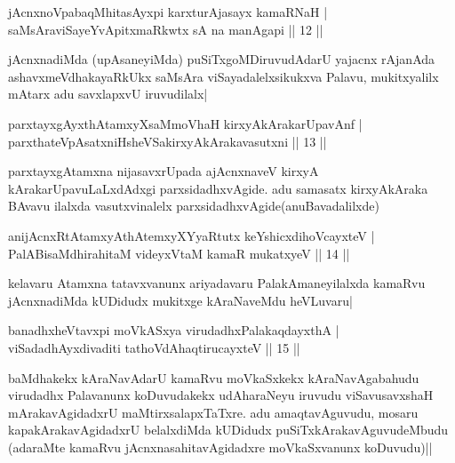 
\begin{shl}
jAcnxnoVpabaqMhitasAyxpi karxturAjasayx kamaRNaH |\\
saMsAraviSayeYvA\s \s pitxmaRkwtx sA na manAgapi \hfill || 12 ||
\end{shl}

\begin{artha}
jAcnxnadiMda (upAsaneyiMda) puSiTxgoMDiruvudAdarU yajacnx rAjanAda ashavxmeVdhakayaRkUkx saMsAra viSayadalelxsikukxva Palavu, mukitxyalilx mAtarx adu savxlapxvU iruvudilalx|
\end{artha}


\begin{shl}
parxtayxgAyxthAtamxyXsaMmoVhaH kirxyAkArakarUpavAnf |\\
parxthateV\s pAsatxniHsheVSakirxyAkArakavasutxni \hfill || 13 ||
\end{shl}

\begin{artha}
parxtayxgAtamxna nijasavxrUpada ajAcnxnaveV kirxyA kArakarUpavuLaLxdAdxgi parxsidadhxvAgide. adu samasatx kirxyAkAraka BAvavu ilalxda vasutxvinalelx parxsidadhxvAgide(anuBavadalilxde)
\end{artha}


\begin{shl}
anijAcnxRtAtamxyAthAtemxyXYyaRtutx keYshicxdihoVcayxteV |\\
PalABisaMdhirahitaM videyxVtaM kamaR mukatxyeV \hfill || 14 ||
\end{shl}

\begin{artha}
kelavaru Atamxna tatavxvanunx ariyadavaru PalakAmaneyilalxda kamaRvu jAcnxnadiMda kUDidudx mukitxge kAraNaveMdu heVLuvaru|
\end{artha}


\begin{shl}
banadhxheVtavxpi moVkASxya virudadhxPalakaqdayxthA |\\
viSadadhAyxdivaditi tathoVdAhaqtirucayxteV \hfill || 15 ||
\end{shl}

\begin{artha}
baMdhakekx kAraNavAdarU kamaRvu moVkaSxkekx kAraNavAgabahudu virudadhx Palavanunx koDuvudakekx udAharaNeyu iruvudu viSavusavxshaH mArakavAgidadxrU maMtirxsalapxTaTxre. adu amaqtavAguvudu, mosaru kapakArakavAgidadxrU belalxdiMda kUDidudx puSiTxkArakavAguvudeMbudu (adaraMte kamaRvu jAcnxnasahitavAgidadxre moVkaSxvanunx koDuvudu)||
\end{artha}

